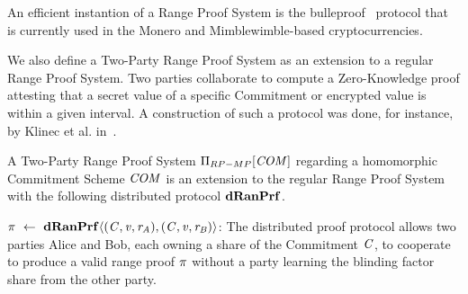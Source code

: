 An efficient instantion of a Range Proof System is the bulleproof~\cite{bunz2018bulletproofs} protocol that is currently used in the Monero and Mimblewimble-based cryptocurrencies.

We also define a Two-Party Range Proof System as an extension to a regular Range Proof System.
Two parties collaborate to compute a Zero-Knowledge proof attesting that a secret value of a specific Commitment or encrypted value is within a given interval.
A construction of such a protocol was done, for instance, by Klinec et al. in~\cite{klinec2020privacy}.

\begin{definition}\label{def:pre:mp-rangeproof}
    A Two-Party Range Proof System $\Pi_{RP-MP}[\mathit{COM}]$ regarding a homomorphic Commitment Scheme $\mathit{COM}$ is an extension to the regular Range Proof System with the following
    distributed protocol $\mathbf{dRanPrf}$.
    \begin{asparaitem}
        \item $\pi ~\leftarrow~ \mathbf{dRanPrf} \langle(\mathit{C},\mathit{v},\mathit{r}_{\mathit{A}}),(\mathit{C},\mathit{v},\mathit{r}_{\mathit{B}})\rangle$: The distributed proof protocol allows two parties Alice and Bob, each owning a share of the
        Commitment $\mathit{C}$, to cooperate to produce a valid range proof $\pi$ without a party learning the blinding factor share from the other party.
    \end{asparaitem}
\end{definition}


